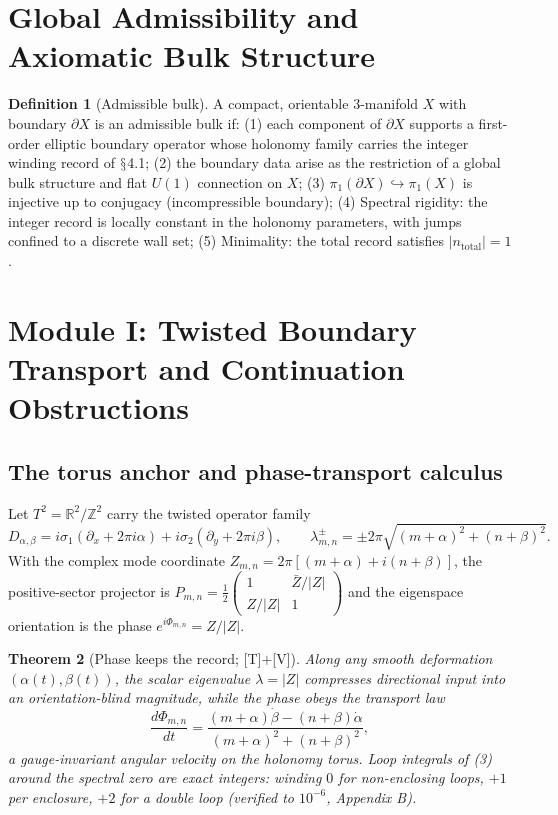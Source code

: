 \documentclass[11pt]{article}
\theoremstyle{definition}
\newtheorem{definition}{Definition}[section]
\theoremstyle{plain}
\newtheorem{theorem}[definition]{Theorem}
\begin{document}
\section{Global Admissibility and Axiomatic Bulk Structure}

\begin{definition}[Admissible bulk]
A compact, orientable 3-manifold $X$ with boundary $\partial X$ is an admissible
bulk if: (1) each component of $\partial X$ supports a first-order elliptic
boundary operator whose holonomy family carries the integer winding record of
$\mathsection$4.1; (2) the boundary data arise as the restriction of a global bulk structure
and flat $U(1)$ connection on $X$; (3) $\pi_1(\partial X) \hookrightarrow \pi_1(X)$
is injective up to conjugacy (incompressible boundary); (4) Spectral rigidity: the
integer record is locally constant in the holonomy parameters, with jumps confined
to a discrete wall set; (5) Minimality: the total record satisfies
$|n_{\mathrm{total}}| = 1$.
\end{definition}

\section{Module I: Twisted Boundary Transport and Continuation Obstructions}

\subsection{The torus anchor and phase-transport calculus}

Let $T^2 = \mathbb{R}^2/\mathbb{Z}^2$ carry the twisted operator family
\begin{equation}
D_{\alpha,\beta} = i\sigma_1(\partial_x + 2\pi i \alpha) + i\sigma_2(\partial_y +
2\pi i \beta), \qquad
\lambda^{\pm}_{m,n} = \pm 2\pi\sqrt{(m+\alpha)^2 + (n+\beta)^2}.
\end{equation}
With the complex mode coordinate $Z_{m,n} = 2\pi[(m+\alpha) + i(n+\beta)]$, the
positive-sector projector is
$P_{m,n} = \tfrac{1}{2}\left(\begin{smallmatrix} 1 & \bar{Z}/|Z| \\ Z/|Z| & 1
\end{smallmatrix}\right)$
and the eigenspace orientation is the phase $e^{i\Phi_{m,n}} = Z/|Z|$.

\begin{theorem}[Phase keeps the record; {[T]}$+${[V]}]
Along any smooth deformation $(\alpha(t),\beta(t))$, the scalar eigenvalue
$\lambda = |Z|$ compresses directional input into an orientation-blind magnitude,
while the phase obeys the transport law
\begin{equation}
\frac{d\Phi_{m,n}}{dt} = \frac{(m+\alpha)\dot\beta - (n+\beta)\dot\alpha}
{(m+\alpha)^2 + (n+\beta)^2},
\end{equation}
a gauge-invariant angular velocity on the holonomy torus. Loop integrals of (3)
around the spectral zero are exact integers: winding $0$ for non-enclosing loops,
$+1$ per enclosure, $+2$ for a double loop (verified to $10^{-6}$, Appendix B).
\end{theorem}
\end{document}
